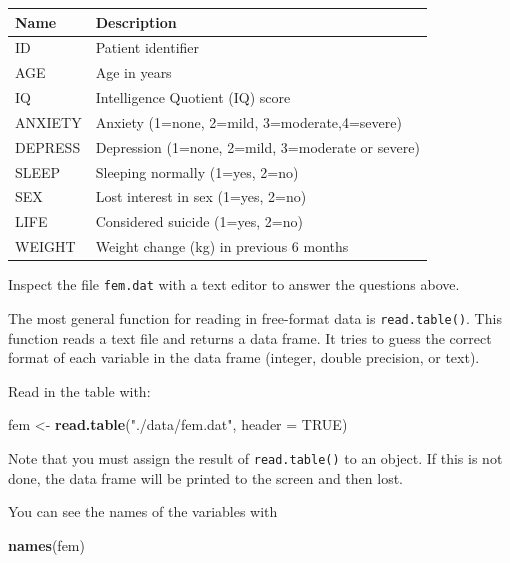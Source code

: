 \documentclass[
]{book}
\newenvironment{Shaded}{\begin{snugshade}}{\end{snugshade}}
\newcommand{\AttributeTok}[1]{\textcolor[rgb]{0.13,0.29,0.53}{#1}}
\newcommand{\ConstantTok}[1]{\textcolor[rgb]{0.56,0.35,0.01}{#1}}
\newcommand{\FunctionTok}[1]{\textcolor[rgb]{0.13,0.29,0.53}{\textbf{#1}}}
\newcommand{\NormalTok}[1]{#1}
\newcommand{\OtherTok}[1]{\textcolor[rgb]{0.56,0.35,0.01}{#1}}
\newcommand{\StringTok}[1]{\textcolor[rgb]{0.31,0.60,0.02}{#1}}
\newcounter{none} %
\begin{document}
{\def\LTcaptype{none} %
\begin{longtable}[]{@{}ll@{}}
\toprule\noalign{}
Name & Description \\
\midrule\noalign{}
\endhead
\bottomrule\noalign{}
\endlastfoot
ID & Patient identifier \\
AGE & Age in years \\
IQ & Intelligence Quotient (IQ) score \\
ANXIETY & Anxiety (1=none, 2=mild, 3=moderate,4=severe) \\
DEPRESS & Depression (1=none, 2=mild, 3=moderate or severe) \\
SLEEP & Sleeping normally (1=yes, 2=no) \\
SEX & Lost interest in sex (1=yes, 2=no) \\
LIFE & Considered suicide (1=yes, 2=no) \\
WEIGHT & Weight change (kg) in previous 6 months \\
\end{longtable}
}

Inspect the file \texttt{fem.dat} with a text editor to answer the
questions above.

The most general function for reading in free-format data is
\texttt{read.table()}. This function reads a text file and returns a
data frame. It tries to guess the correct format of each variable in
the data frame (integer, double precision, or text).

Read in the table with:

\begin{Shaded}
\begin{Highlighting}[]
\NormalTok{fem }\OtherTok{\textless{}{-}} \FunctionTok{read.table}\NormalTok{(}\StringTok{"./data/fem.dat"}\NormalTok{, }\AttributeTok{header =} \ConstantTok{TRUE}\NormalTok{)}
\end{Highlighting}
\end{Shaded}

Note that you must assign the result of \texttt{read.table()} to an
object. If this is not done, the data frame will be printed to the
screen and then lost.

You can see the names of the variables with

\begin{Shaded}
\begin{Highlighting}[]
\FunctionTok{names}\NormalTok{(fem)}
\end{Highlighting}
\end{Shaded}
\end{document}
